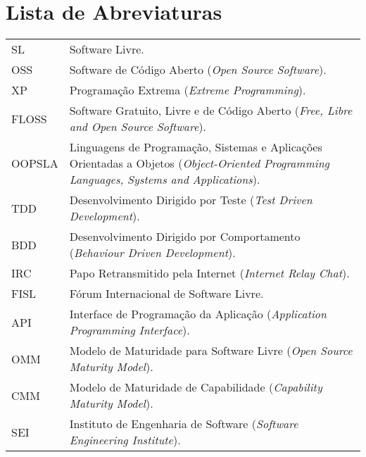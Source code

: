 \documentclass[11pt,twoside,a4paper]{book}
\begin{document}
\chapter{Lista de Abreviaturas}
\begin{tabular}{lp{14cm}}
  SL       & Software Livre.\\
  OSS         & Software de Código Aberto (\emph{Open Source
    Software}).\\
  XP       & Programação Extrema (\emph{Extreme Programming}).\\
  FLOSS       & Software Gratuito, Livre e de Código Aberto
  (\emph{Free, Libre and Open Source Software}).\\
  OOPSLA       & Linguagens de Programação, Sistemas e Aplicações
  Orientadas a Objetos (\emph{Object-Oriented Programming Languages, Systems and Applications}).\\
  TDD       & Desenvolvimento Dirigido por Teste
  (\emph{Test Driven Development}).\\
  BDD       & Desenvolvimento Dirigido por Comportamento
  (\emph{Behaviour Driven Development}).\\
  IRC       & Papo Retransmitido pela Internet (\emph{Internet Relay
    Chat}).\\
  FISL       & Fórum Internacional de Software Livre.\\
  API       & Interface de Programação da Aplicação (\emph{Application
    Programming Interface}).\\
  OMM       & Modelo de Maturidade para Software Livre (\emph{Open
    Source Maturity Model}).\\
  CMM       & Modelo de Maturidade de Capabilidade (\emph{Capability
    Maturity Model}).\\
  SEI       & Instituto de Engenharia de Software (\emph{Software
    Engineering Institute}).\\
\end{tabular}


\listoffigures %

\mainmatter
\fancyhead[RE,LO]{\thesection}
\end{document}
